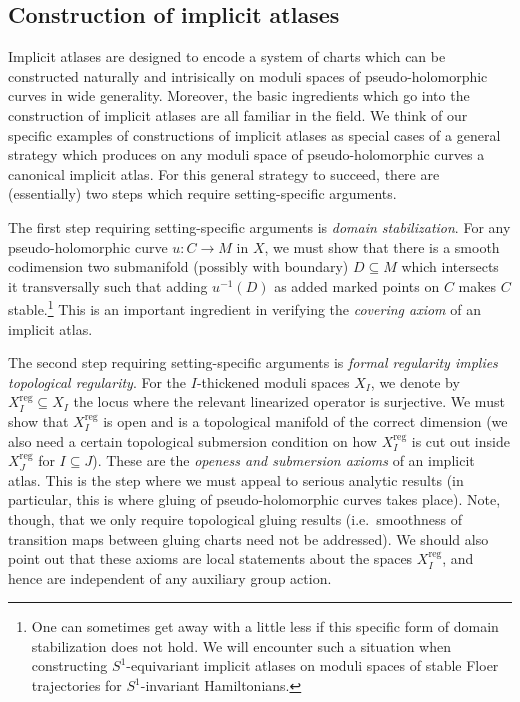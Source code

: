 \documentclass[12pt]{article}
\theoremstyle{definition}
\theoremstyle{remark}
\numberwithin{equation}{subsection}
\newcommand{\reg}{\mathrm{reg}}
\begin{document}
\subsection{Construction of implicit atlases}\label{constructionIntro}

Implicit atlases are designed to encode a system of charts which can be constructed naturally and intrisically on moduli spaces of pseudo-holomorphic curves in wide generality.  Moreover, the basic ingredients which go into the construction of implicit atlases are all familiar in the field.  We think of our specific examples of constructions of implicit atlases as special cases of a general strategy which produces on any moduli space of pseudo-holomorphic curves a canonical implicit atlas.  For this general strategy to succeed, there are (essentially) two steps which require setting-specific arguments.

The first step requiring setting-specific arguments is \emph{domain stabilization}.  For any pseudo-holomorphic curve $u:C\to M$ in $X$, we must show that there is a smooth codimension two submanifold (possibly with boundary) $D\subseteq M$ which intersects it transversally such that adding $u^{-1}(D)$ as added marked points on $C$ makes $C$ stable.\footnote{One can sometimes get away with a little less if this specific form of domain stabilization does not hold.  We will encounter such a situation when constructing $S^1$-equivariant implicit atlases on moduli spaces of stable Floer trajectories for $S^1$-invariant Hamiltonians.}  This is an important ingredient in verifying the \emph{covering axiom} of an implicit atlas.

The second step requiring setting-specific arguments is \emph{formal regularity implies topological regularity}.  For the $I$-thickened moduli spaces $X_I$, we denote by $X_I^\reg\subseteq X_I$ the locus where the relevant linearized operator is surjective.  We must show that $X_I^\reg$ is open and is a topological manifold of the correct dimension (we also need a certain topological submersion condition on how $X_I^\reg$ is cut out inside $X_J^\reg$ for $I\subseteq J$).  These are the \emph{openess and submersion axioms} of an implicit atlas.  This is the step where we must appeal to serious analytic results (in particular, this is where gluing of pseudo-holomorphic curves takes place).  Note, though, that we only require topological gluing results (i.e.\ smoothness of transition maps between gluing charts need not be addressed).  We should also point out that these axioms are local statements about the spaces $X_I^\reg$, and hence are independent of any auxiliary group action.
\end{document}
